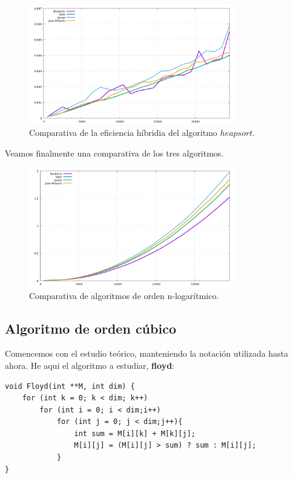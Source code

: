 \documentclass[11pt,a4paper]{article}
\begin{document}
\begin{figure}[H]
	\centering
	\includegraphics[width=0.8\textwidth]{../plots/heapsort}
	\caption{Comparativa de la eficiencia híbridia del algoritmo $heapsort$.}
\end{figure}

Veamos finalmente una comparativa de los tres algoritmos.

\begin{figure}[H]
	\centering
	\includegraphics[width=0.8\textwidth]{../plots/burbuja}
	\caption{Comparativa de algoritmos de orden n-logarítmico.}
\end{figure}

\subsection{Algoritmo de orden cúbico}

Comencemos con el estudio teórico, manteniendo la notación utilizada hasta ahora. He aqui el algoritmo a estudiar, \textbf{floyd}:

\begin{lstlisting}
void Floyd(int **M, int dim) {
	for (int k = 0; k < dim; k++)
		for (int i = 0; i < dim;i++)
			for (int j = 0; j < dim;j++){
				int sum = M[i][k] + M[k][j];    	
				M[i][j] = (M[i][j] > sum) ? sum : M[i][j];
			}
}	     	
\end{lstlisting}
\end{document}
